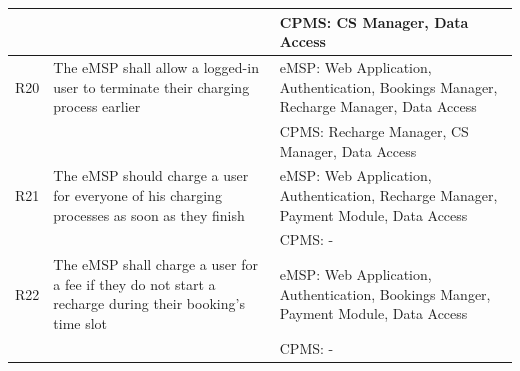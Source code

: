 \documentclass[11pt]{article}
\begin{document}
\begin{table}[H]
\begin{tabularx}{\textwidth}{|>{\centering\hsize=0.15\hsize}X|>{\hsize=1.425\hsize}X|>{\hsize=1.425\hsize}X|}
        & & CPMS: CS Manager, Data Access \\
        \hline
        R20 & The eMSP shall allow a logged-in user to terminate their charging process earlier & eMSP: Web Application, Authentication, Bookings Manager, Recharge Manager, Data Access \\
        & & CPMS: Recharge Manager, CS Manager, Data Access \\
        \hline
        R21 & The eMSP should charge a user for everyone of his charging processes as soon as they finish & eMSP: Web Application, Authentication, Recharge Manager, Payment Module, Data Access \\
        & & CPMS: - \\
        \hline
        R22 & The eMSP shall charge a user for a fee if they do not start a recharge during their booking's time slot & eMSP: Web Application, Authentication, Bookings Manger, Payment Module, Data Access \\
        & & CPMS: - \\
        \hline
    \end{tabularx}
    \label{tab:requirements}
\end{table}
\end{document}
